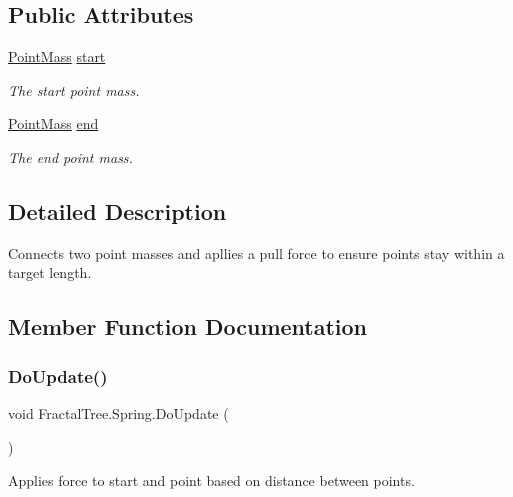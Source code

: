 \subsection*{Public Attributes}
\begin{DoxyCompactItemize}
\item 
\hyperlink{class_fractal_tree_1_1_point_mass}{Point\+Mass} \hyperlink{class_fractal_tree_1_1_spring_a4008f4f4f6404df50062047b0afa2ec8}{start}
\begin{DoxyCompactList}\small\item\em The start point mass. \end{DoxyCompactList}\item 
\hyperlink{class_fractal_tree_1_1_point_mass}{Point\+Mass} \hyperlink{class_fractal_tree_1_1_spring_a22f6b5200ab129728b9fbb06b5faca1f}{end}
\begin{DoxyCompactList}\small\item\em The end point mass. \end{DoxyCompactList}\end{DoxyCompactItemize}


\subsection{Detailed Description}
Connects two point masses and apllies a pull force to ensure points stay within a target length. 



\subsection{Member Function Documentation}
\hypertarget{class_fractal_tree_1_1_spring_a38d6d4709c69509ef73c1725a53e470a}{}\label{class_fractal_tree_1_1_spring_a38d6d4709c69509ef73c1725a53e470a} 
\subsubsection{\texorpdfstring{Do\+Update()}{DoUpdate()}}
{\footnotesize\ttfamily void Fractal\+Tree.\+Spring.\+Do\+Update (\begin{DoxyParamCaption}{ }\end{DoxyParamCaption})}



Applies force to start and point based on distance between points. 

